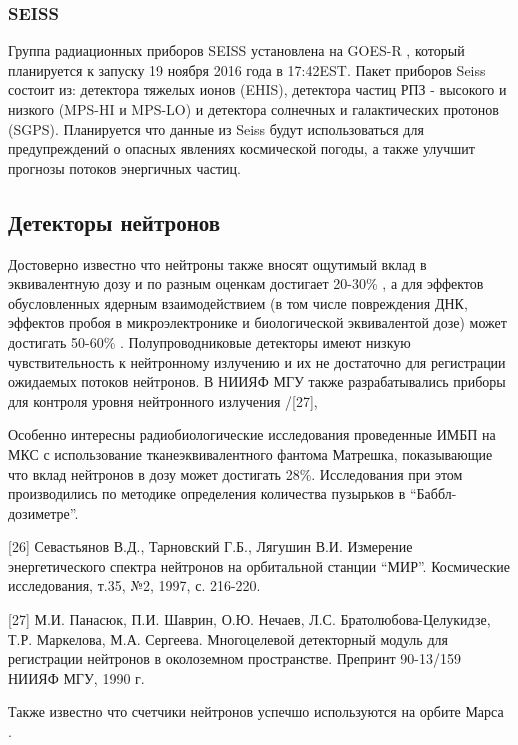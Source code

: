 \subsubsection{SEISS}
Группа радиационных приборов SEISS установлена на GOES-R \cite{Goodman2013}, который планируется к запуску 19 ноября 2016 года в 17:42EST. 
Пакет приборов Seiss состоит из: детектора тяжелых ионов  (EHIS), детектора частиц РПЗ - высокого и низкого (MPS-HI и MPS-LO) и детектора солнечных и галактических протонов (SGPS). Планируется что данные из Seiss будут использоваться для предупреждений о опасных явлениях космической погоды, а также улучшит прогнозы потоков энергичных частиц. 


\subsection{Детекторы нейтронов} \label{subsect1_3_1}
Достоверно известно что нейтроны также вносят ощутимый вклад в эквивалентную дозу и по разным оценкам достигает 20-30\% \cite{Dudkin1990}, а для эффектов обусловленных ядерным взаимодействием (в том числе повреждения ДНК, эффектов пробоя в микроэлектронике и биологической эквивалентой дозе) может достигать 50-60\% \cite{Armstrong2001}. Полупроводниковые детекторы имеют низкую чувствительность к нейтронному излучению и их не достаточно для регистрации ожидаемых потоков нейтронов. В НИИЯФ МГУ также разрабатывались приборы для контроля уровня нейтронного излучения  /[27],\cite{Shavrin2002}

Особенно интересны радиобиологические исследования проведенные ИМБП \cite{Shurshakov2016} на МКС с использование тканеэквивалентного фантома Матрешка, показывающие что вклад нейтронов в дозу может достигать 28\%.  Исследования при этом производились по методике определения количества пузырьков в ``Баббл-дозиметре''.

[26]  Севастьянов В.Д., Тарновский Г.Б., Лягушин В.И.  Измерение энергетического спектра нейтронов на орбитальной станции “МИР”.  Космические исследования, т.35, №2, 1997, с. 216-220.

[27]  М.И. Панасюк, П.И. Шаврин, О.Ю. Нечаев, Л.С. Братолюбова-Целукидзе, Т.Р. Маркелова, М.А. Сергеева. Многоцелевой детекторный модуль для регистрации нейтронов в околоземном пространстве. Препринт 90-13/159 НИИЯФ МГУ, 1990 г.

Также известно что счетчики нейтронов успечшо используются на орбите Марса \cite{Sanin2012}.

